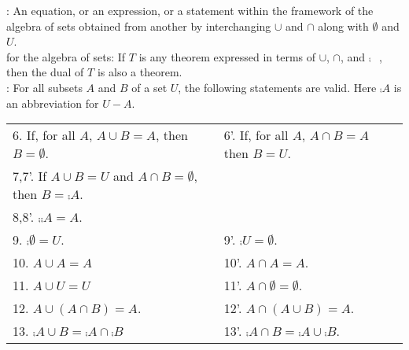\documentclass[12pt]{book}
\begin{document}
: An equation, or an expression, or a statement within the framework of the algebra of sets obtained from another by interchanging $\cup$ and $\cap$ along with $\emptyset$ and $U$.\\

 for the algebra of sets: If $T$ is any theorem expressed in terms of $\cup$, $\cap$, and $\comp{\phantom{A}}$, then the dual of $T$ is also a theorem.\\

: For all subsets $A$ and $B$ of a set $U$, the following statements are valid. Here $\comp{A}$ is an abbreviation for $U - A$.\\
\begin{tabular}{ll}
6. If, for all $A$, $A \cup B = A$, then $B = \emptyset$.& 6'. If, for all $A$, $A \cap B = A$ then $B = U$.\\
7,7'. If $A \cup B = U$ and $A \cap B = \emptyset$, then $B = \comp{A}$.\\
8,8'. $\comp{\comp{A}} = A$.\\
9. $\comp{\emptyset} = U$.& 9'. $\comp{U} = \emptyset$.\\
10. $A \cup A = A$& 10'. $A \cap A = A$.\\
11. $A \cup U = U$& 11'. $A \cap \emptyset = \emptyset$.\\
12. $A \cup (A \cap B) = A$. &12'. $A \cap (A \cup B) = A$.\\
13. $\comp{A \cup B} = \comp{A} \cap \comp{B}$& 13'. $\comp{A \cap B} = \comp{A} \cup \comp{B}$.
\end{tabular}\\
\end{document}
